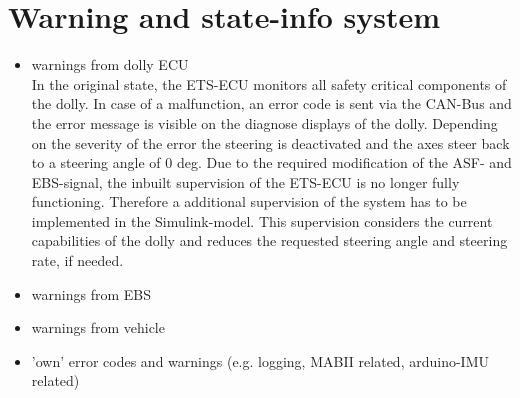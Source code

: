 \documentclass[ExampleMasters.tex]{subfiles}
\begin{document}
\section{Warning and state-info system}
\label{sec:warning_system}
\begin{itemize}
	\item warnings from dolly \gls{ECU} \\
	In the original state, the \gls{ETS}-\gls{ECU} monitors all safety critical components of the dolly. In case of a malfunction, an error code is sent via the \gls{CAN}-Bus and the error message is visible on the diagnose displays of the dolly. Depending on the severity of the error the steering is deactivated and the axes steer back to a steering angle of 0 deg.
	Due to the required modification of the \gls{ASF}- and \gls{EBS}-signal, the inbuilt supervision of the \gls{ETS}-\gls{ECU} is no longer fully functioning. Therefore a additional supervision of the system has to be implemented in the Simulink-model. This supervision considers the current capabilities of the dolly and reduces the requested steering angle and steering rate, if needed.    
	\item warnings from \gls{EBS}
	\item warnings from vehicle
	\item 'own' error codes and warnings (e.g. logging, \gls{MABII} related, arduino-\gls{IMU} related)
\end{itemize}
\end{document}
